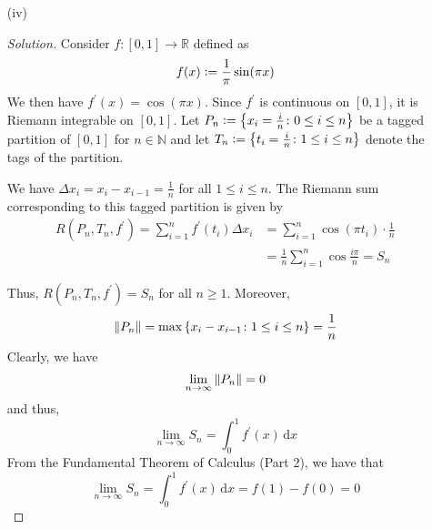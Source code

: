 \documentclass[12pt]{article}
\def\D{\mathrm{d}}
\theoremstyle{definition}
\newenvironment{soln}{\begin{proof}[Solution]}{\end{proof}}
\begin{document}
\begin{enumerate}[leftmargin=*]
\begin{enumerate}[leftmargin=*]
\begin{soln}
        Thus, $R(P_n, T_n, f^{\prime}) = S_n$ for all $n \geq 1$. Moreover, 
        \[
            \norm{P_n} = \max \left\{ x_i - x_{i-1} \colon 1 \leq i \leq n \right\} = \frac{1}{n}
        \]
        Clearly, we have
        \[
            \lim_{n \to \infty} \norm{P_n} = 0
        \]
        and thus,
        \[
            \lim_{n \to \infty} S_n = \int_0^1 f^{\prime}(x) \, \D x
        \]
        From the Fundamental Theorem of Calculus (Part $2$), we have that
        \[
            \lim_{n \to \infty} S_n = \int_0^1 f^{\prime}(x) \, \D x = f(1) - f(0) = \boxed{\frac{\pi}{4}}
        \]
        \end{soln}
        
        \item[(iv)] 
        \begin{soln}
    
        Consider $f : [0,1] \to \mathbb{R}$ defined as 
        \[
            f(x) \vcentcolon= \frac{1}{\pi} \sin(\pi x) 
        \]
        We then have $f^{\prime}(x) = \cos(\pi x)$. Since $f^{\prime}$ is continuous on $[0,1]$, it is Riemann integrable on $[0,1]$. Let $P_n \vcentcolon= \left\{ x_i = \frac{i}{n} \colon 0 \leq i \leq n \right\}$ be a tagged partition of $[0,1]$ for $n \in \mathbb{N}$ and let $T_n \vcentcolon= \left\{ t_i = \frac{i}{n} \colon 1 \leq i \leq n\right\}$ denote the tags of the partition. 
        
        \medskip
        
        We have $\Delta x_i = x_{i} - x_{i-1} = \frac{1}{n}$ for all $1 \leq i \leq n$. The Riemann sum corresponding to this tagged partition is given by 
        \begin{align*}
            R(P_n, T_n, f^{\prime}) = \sum_{i=1}^{n} f^{\prime}(t_i) \Delta x_i &= \sum_{i=1}^n \cos(\pi t_i) \cdot \frac{1}{n} \\
            &= \frac{1}{n} \sum\limits_{i=1}^n \cos \frac{i\pi}{n} = S_n
        \end{align*}
        
        Thus, $R(P_n, T_n, f^{\prime}) = S_n$ for all $n \geq 1$. Moreover, 
        \[
            \norm{P_n} = \max \left\{ x_i - x_{i-1} \colon 1 \leq i \leq n \right\} = \frac{1}{n}
        \]
        Clearly, we have
        \[
            \lim_{n \to \infty} \norm{P_n} = 0
        \]
        and thus,
        \[
            \lim_{n \to \infty} S_n = \int_0^1 f^{\prime}(x) \, \D x
        \]
        From the Fundamental Theorem of Calculus (Part $2$), we have that
        \[
            \lim_{n \to \infty} S_n = \int_0^1 f^{\prime}(x) \, \D x = f(1) - f(0) = \boxed{0}
        \]
        \end{soln}
    \end{enumerate}
    

\end{enumerate}
\end{document}
